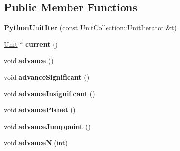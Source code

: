 \subsection*{Public Member Functions}
\begin{DoxyCompactItemize}
\item 
{\bfseries Python\+Unit\+Iter} (const \hyperlink{classUnitCollection_1_1UnitIterator}{Unit\+Collection\+::\+Unit\+Iterator} \&t)\hypertarget{classUniverseUtil_1_1PythonUnitIter_aa8551262acdca17c9b17883c736bbfb8}{}\label{classUniverseUtil_1_1PythonUnitIter_aa8551262acdca17c9b17883c736bbfb8}

\item 
\hyperlink{classUnit}{Unit} $\ast$ {\bfseries current} ()\hypertarget{classUniverseUtil_1_1PythonUnitIter_a98b056a0151fcfe927853369fe2b095a}{}\label{classUniverseUtil_1_1PythonUnitIter_a98b056a0151fcfe927853369fe2b095a}

\item 
void {\bfseries advance} ()\hypertarget{classUniverseUtil_1_1PythonUnitIter_a946858924b6337480074ff65b645beeb}{}\label{classUniverseUtil_1_1PythonUnitIter_a946858924b6337480074ff65b645beeb}

\item 
void {\bfseries advance\+Significant} ()\hypertarget{classUniverseUtil_1_1PythonUnitIter_a5ef4e74f706b53a854ae4a3e6c1c5754}{}\label{classUniverseUtil_1_1PythonUnitIter_a5ef4e74f706b53a854ae4a3e6c1c5754}

\item 
void {\bfseries advance\+Insignificant} ()\hypertarget{classUniverseUtil_1_1PythonUnitIter_a7c7f07f3019fb3562340330cc16a29d7}{}\label{classUniverseUtil_1_1PythonUnitIter_a7c7f07f3019fb3562340330cc16a29d7}

\item 
void {\bfseries advance\+Planet} ()\hypertarget{classUniverseUtil_1_1PythonUnitIter_ac3e88aaa0066060292c1ae200e7346fa}{}\label{classUniverseUtil_1_1PythonUnitIter_ac3e88aaa0066060292c1ae200e7346fa}

\item 
void {\bfseries advance\+Jumppoint} ()\hypertarget{classUniverseUtil_1_1PythonUnitIter_a395e54778f29b4aaa41a5d780c625482}{}\label{classUniverseUtil_1_1PythonUnitIter_a395e54778f29b4aaa41a5d780c625482}

\item 
void {\bfseries advanceN} (int)\hypertarget{classUniverseUtil_1_1PythonUnitIter_a0a754db66ca69e6a23e75c10c302cc4d}{}\label{classUniverseUtil_1_1PythonUnitIter_a0a754db66ca69e6a23e75c10c302cc4d}


\end{DoxyCompactItemize}

